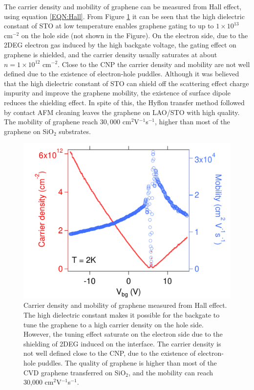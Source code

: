 \documentclass[pdflatex, sectionletters, 12pt]{pittetd}    %
\begin{document}
The carrier density and mobility of graphene can be measured from Hall effect, using equation \ref{EQN:Hall}. From Figure \ref{FIG:CarrierDensityMobility} it can be seen that the high dielectric constant of STO at low temperature enables graphene gating to up to $1 \times 10^{13}$ $\mathrm{cm}^{-2}$ on the hole side (not shown in the Figure). On the electron side, due to the 2DEG electron gas induced by the high backgate voltage, the gating effect on graphene is shielded, and the carrier density usually saturates at about $n = 1 \times 10^{12}$ $\mathrm{cm}^{-2}$. Close to the CNP the carrier density and mobility are not well defined due to the existence of electron-hole puddles. Although it was believed that the high dielectric constant of STO can shield off the scattering effect charge impurity and improve the graphene mobility, the existence of surface dipole reduces the shielding effect\cite{sachs2014ferroelectric}. In spite of this, the Hyflon transfer method followed by contact AFM cleaning leaves the graphene on LAO/STO with high quality. The mobility of graphene reach $30,000$ cm$^{2}$V$^{-1}$s$^{-1}$, higher than most of the graphene on SiO$_2$ substrates. 
\\

\begin{figure}[h!]
	\centering
	\includegraphics[width=.55\textwidth]{Drawing/CarrierDensityMobility.pdf}
	\caption{Carrier density and mobility of graphene measured from Hall effect. The high dielectric constant makes it possible for the backgate to tune the graphene to a high carrier density on the hole side. However, the tuning effect saturate on the electron side due to the shielding of 2DEG induced on the interface. The carrier density is not well defined close to the CNP, due to the existence of electron-hole puddles. The quality of graphene is higher than most of the CVD graphene transferred on SiO$_2$, and the mobility can reach 30,000 cm$^2$V$^{-1}$s$^{-1}$.}
	\label{FIG:CarrierDensityMobility}
\end{figure}
\end{document}
